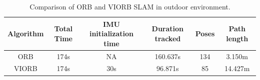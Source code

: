 \begin{table}[h]
	\caption[Comparison of ORB and VIORB SLAM in outdoor environment.]{\small Comparison of ORB and VIORB SLAM in outdoor environment.}
	\begin{tabular}{|c|c|c|c|c|c|}
		\hline 
		Algorithm & Total Time & IMU initialization time & Duration tracked & Poses & Path length \\ \hline \hline
		ORB & 174s & NA & 160.637s  & 134 & 3.150m  \\ \hline
		VIORB & 174s & 30s & 96.871s & 85 & 14.427m \\ \hline
	\end{tabular}
	\label{tab:outdoor-comparision}
\end{table} 

\FloatBarrier

